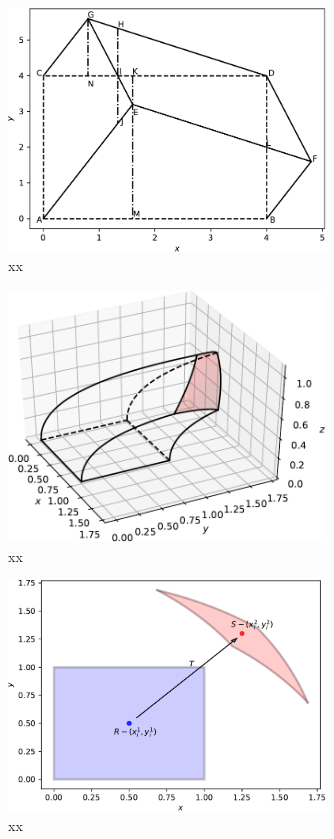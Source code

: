 \documentclass{article}
\theoremstyle{theorem}
\theoremstyle{definition}
\begin{document}
\begin{figure}[htb]
\centering
\includegraphics[width=0.75\textwidth]{prismatoid_xy.pdf}
\caption{xx}
\label{fig:prismatoid_xy}
\end{figure}

\begin{figure}[htb]
\centering
\includegraphics[width=0.75\textwidth]{sphere_solid.pdf}
\caption{xx}
\label{fig:sphere_solid}
\end{figure}

\begin{figure}[htb]
\centering
\includegraphics[width=0.75\textwidth]{sphere_regions.pdf}
\caption{xx}
\label{fig:sphere_regions}
\end{figure}
\end{document}
